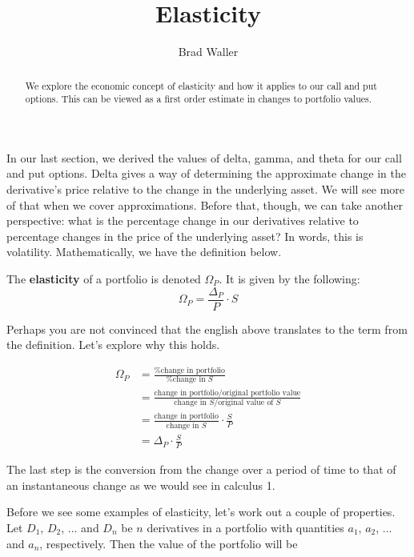 \documentclass{ximera}
\author{Brad Waller}
\title{Elasticity}
\begin{document}
\begin{abstract}
We explore the economic concept of elasticity and how it applies to our call and put options. This can be viewed as a first order estimate in changes to portfolio values.
\end{abstract}

\maketitle

In our last section, we derived the values of delta, gamma, and theta for our call and put options. Delta gives a way of determining the approximate change in the derivative's price relative to the change in the underlying asset. We will see more of that when we cover approximations. Before that, though, we can take another perspective: what is the percentage change in our derivatives relative to percentage changes in the price of the underlying asset? In words, this is volatility. Mathematically, we have the definition below.

\begin{definition}
The {\bf elasticity} of a portfolio is denoted $\Omega_P$. It is given by the following:
	\begin{equation*}
	\Omega_P=\frac{\Delta_P}{P}\cdot S
	\end{equation*}
\end{definition}

Perhaps you are not convinced that the english above translates to the term from the definition. Let's explore why this holds.

\begin{align*}
\Omega_P 		&=\frac{\%\text{change in portfolio}}{\% \text{change in }S}\\
			&=\frac{\text{change in portfolio}/\text{original portfolio value}}{\text{change in }S/\text{original value of }S}\\
			&=\frac{\text{change in portfolio}}{\text{change in }S}\cdot \frac{S}{P}\\
			&=\Delta_P\cdot\frac{S}{P}
\end{align*}

The last step is the conversion from the change over a period of time to that of an instantaneous change as we would see in calculus 1. 

Before we see some examples of elasticity, let's work out a couple of properties. Let $D_1$, $D_2$, ... and $D_n$ be $n$ derivatives in a portfolio with quantities $a_1$, $a_2$, ... and $a_n$, respectively. Then the value of the portfolio will be
\end{document}
